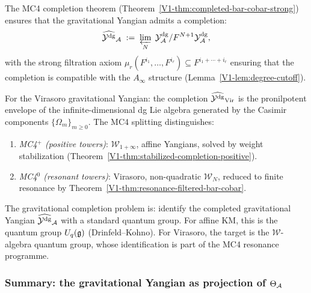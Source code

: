 \begin{remark}
The MC4 completion theorem
(Theorem~\ref{V1-thm:completed-bar-cobar-strong}) ensures that the
gravitational Yangian admits a completion:
\begin{equation}%
\widehat{\Ydg}_\cA
\;:=\;
\varprojlim_{N}\;
\Ydg_\cA / F^{N+1}\Ydg_\cA,
\end{equation}
with the strong filtration axiom
$\mu_r(F^{i_1},\dotsc,F^{i_r}) \subseteq F^{i_1+\cdots+i_r}$
ensuring that the completion is compatible with the $A_\infty$
structure (Lemma~\ref{V1-lem:degree-cutoff}).

For the Virasoro gravitational Yangian: the completion
$\widehat{\mathcal{Y}^{\mathrm{dg}}}_{\mathrm{Vir}}$ is the pronilpotent envelope of
the infinite-dimensional dg Lie algebra generated by the Casimir
components $\{\Omega_m\}_{m \geq 0}$. The MC4 splitting
distinguishes:
\begin{enumerate}[label=\textup{(\roman*)}]
\item \emph{MC4$^+$ (positive towers)}:
 $\mathcal{W}_{1+\infty}$, affine Yangians, solved by weight
 stabilization
 (Theorem~\ref{V1-thm:stabilized-completion-positive}).
\item \emph{MC4$^0$ (resonant towers)}:
 Virasoro, non-quadratic $\mathcal{W}_N$, reduced to finite
 resonance by
 Theorem~\ref{V1-thm:resonance-filtered-bar-cobar}.
\end{enumerate}
The gravitational completion problem is: identify the completed
gravitational Yangian $\widehat{\mathcal{Y}^{\mathrm{dg}}}_{\mathcal{A}}$ with a standard
quantum group. For affine KM, this is the quantum group
$U_q(\mathfrak{g})$ (Drinfeld--Kohno). For Virasoro, the target is the
$\mathcal{W}$-algebra quantum group, whose identification is
part of the MC4 resonance programme.
\end{remark}


\subsubsection{Summary: the gravitational Yangian as projection of $\Theta_{\mathcal{A}}$}

